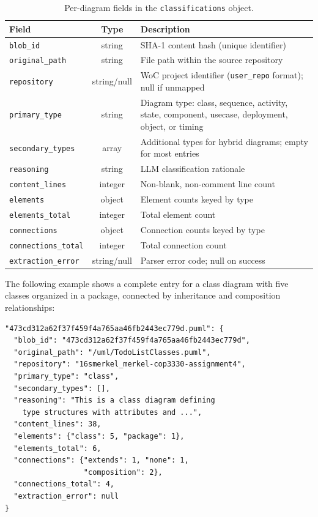 \documentclass[11pt]{article}
\begin{document}
\begin{table}[H]
\caption{Per-diagram fields in the \texttt{classifications} object.\label{tab:metadata-fields}}
\begin{tabularx}{\textwidth}{lcL}
\toprule
\textbf{Field} & \textbf{Type} & \textbf{Description} \\
\midrule
\texttt{blob\_id}           & string      & SHA-1 content hash (unique identifier) \\
\texttt{original\_path}     & string      & File path within the source repository \\
\texttt{repository}         & string/null & WoC project identifier (\texttt{user\_repo} format); null if unmapped \\
\texttt{primary\_type}      & string      & Diagram type: class, sequence, activity, state, component, usecase, deployment, object, or timing \\
\texttt{secondary\_types}   & array       & Additional types for hybrid diagrams; empty for most entries \\
\texttt{reasoning}          & string      & LLM classification rationale \\
\texttt{content\_lines}     & integer     & Non-blank, non-comment line count \\
\texttt{elements}           & object      & Element counts keyed by type \\
\texttt{elements\_total}    & integer     & Total element count \\
\texttt{connections}        & object      & Connection counts keyed by type \\
\texttt{connections\_total} & integer     & Total connection count \\
\texttt{extraction\_error}  & string/null & Parser error code; null on success \\
\bottomrule
\end{tabularx}
\end{table}

\noindent The following example shows a complete entry for a class diagram with five classes organized in a package, connected by inheritance and composition relationships:

\begin{verbatim}
"473cd312a62f37f459f4a765aa46fb2443ec779d.puml": {
  "blob_id": "473cd312a62f37f459f4a765aa46fb2443ec779d",
  "original_path": "/uml/TodoListClasses.puml",
  "repository": "16smerkel_merkel-cop3330-assignment4",
  "primary_type": "class",
  "secondary_types": [],
  "reasoning": "This is a class diagram defining
    type structures with attributes and ...",
  "content_lines": 38,
  "elements": {"class": 5, "package": 1},
  "elements_total": 6,
  "connections": {"extends": 1, "none": 1,
                  "composition": 2},
  "connections_total": 4,
  "extraction_error": null
}
\end{verbatim}
\end{document}
